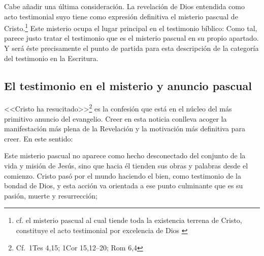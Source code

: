 Cabe añadir una última consideración. La revelación de Dios entendida como acto
testimonial suyo tiene como expresión definitiva el misterio pascual de
Cristo.\footnote{cf. el misterio pascual al cual tiende toda la existencia
  terrena de Cristo, constituye el acto testimonial por excelencia de Dios
  \autocite[128]{prades2015testimonio}} Este misterio ocupa el lugar principal en el testimonio bíblico:
Como tal, parece justo tratar el testimonio que es el misterio pascual en su
propio apartado. Y será éste precisamente el punto de partida para esta
descripción de la categoría del testimonio en la Escritura.

\subsection{El testimonio en el misterio y anuncio pascual}

<<Cristo ha resucitado>>\footnote{Cf.~1Tes 4,15; 1Cor 15,12--20; Rom 6,4} es la
confesión que está en el núcleo del más primitivo anuncio del
evangelio.\autocite[Cf.][403]{ninot2009tf} Creer en esta noticia conlleva acoger la
manifestación más plena de la Revelación y la motivación más definitiva para
creer. En este sentido:

Este misterio pascual no aparece como hecho desconectado del conjunto de la vida
y misión de Jesús, sino que hacia él tienden sus obras y palabras desde el
comienzo. Cristo pasó por el mundo haciendo el bien, como testimonio de la
bondad de Dios, y esta acción va orientada a ese punto culminante que es su
pasión, muerte y resurrección; \autocite[127]{prades2015testimonio}

